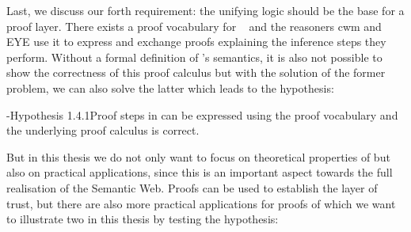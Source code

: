Last, we discuss our forth requirement: the unifying logic should be the base for a proof layer.  
There exists a proof vocabulary for 
\nthreelogic~\cite{Proof} and the reasoners cwm and EYE use it to express and exchange proofs explaining the inference steps they perform. 
Without a formal definition of \nthree's semantics, it is also not possible to show the correctness of this proof calculus but with the solution of the former problem, 
we can also solve the latter which leads to the hypothesis:
% 

\hyp{Hypothesis 1.4.1}{Proof steps in \nthree can be expressed using the \nthree proof vocabulary and the underlying \nthree proof calculus is correct.}

But in this thesis we do not only want to focus on theoretical properties of \nthreelogic but also on practical applications, since this is an important 
aspect towards  the full realisation of the Semantic Web. Proofs can be used to establish the layer of trust, but there are also more practical 
applications for proofs of which we want to illustrate two in this thesis by testing the hypothesis:







